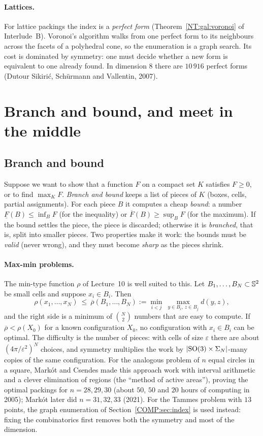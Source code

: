 \paragraph{Lattices.} For lattice packings the index is a \emph{perfect form}
(Theorem~\ref{NT:gal:voronoi} of Interlude~B). Voronoi's algorithm walks from one perfect form to its
neighbours across the facets of a polyhedral cone, so the enumeration is a graph search. Its cost is
dominated by symmetry: one must decide whether a new form is equivalent to one already found. In
dimension $8$ there are $10\,916$ perfect forms (Dutour Sikiri\'c, Sch\"urmann and Vallentin, 2007).

\section{Branch and bound, and meet in the middle}
\label{COMP:sec:bb}

\subsection{Branch and bound}
Suppose we want to show that a function $F$ on a compact set $K$ satisfies $F\ge0$, or to find
$\max_KF$. \emph{Branch and bound} keeps a list of pieces of $K$ (boxes, cells, partial assignments).
For each piece $B$ it computes a cheap \emph{bound}: a number $\underline F(B)\le\inf_BF$ (for the
inequality) or $\overline F(B)\ge\sup_BF$ (for the maximum). If the bound settles the piece, the
piece is discarded; otherwise it is \emph{branched}, that is, split into smaller pieces. Two
properties make it work: the bounds must be \emph{valid} (never wrong), and they must become
\emph{sharp} as the pieces shrink.

\paragraph{Max-min problems.} The min-type function $\rho$ of Lecture~10 is well suited to this. Let
$B_1,\dots,B_N\subset\mathbb{S}^2$ be small cells and suppose $x_i\in B_i$. Then
\[
  \rho(x_1,\dots,x_N)\ \le\ \overline\rho(B_1,\dots,B_N):=\min_{i<j}\ \max_{y\in B_i,\,z\in B_j}d(y,z),
\]
and the right side is a minimum of $\binom N2$ numbers that are easy to compute. If
$\overline\rho<\rho(X_0)$ for a known configuration $X_0$, no configuration with $x_i\in B_i$ can be
optimal. The difficulty is the number of pieces: with cells of size $\varepsilon$ there are about
$(4\pi/\varepsilon^2)^N$ choices, and symmetry multiplies the work by $\left\lvert \mathrm{SO}(3)\times\Sigma_N \right\rvert$-many
copies of the same configuration. For the analogous problem of $n$ equal circles in a square,
Mark\'ot and Csendes made this approach work with interval arithmetic and a clever elimination of
regions (the ``method of active areas''), proving the optimal packings for $n=28,29,30$
(about $50$, $50$ and $20$ hours of computing in 2005); Mark\'ot later did $n=31,32,33$ (2021). For
the Tammes problem with $13$ points, the graph enumeration of Section~\ref{COMP:sec:index} is used
instead: fixing the combinatorics first removes both the symmetry and most of the dimension.

